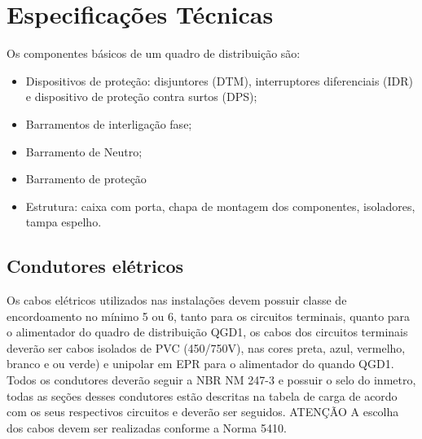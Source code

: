 \chapter{Especificações Técnicas}

Os componentes básicos de um quadro de distribuição são:
\begin{itemize}
\item Dispositivos de proteção: disjuntores (DTM), interruptores diferenciais (IDR) e dispositivo de proteção contra surtos (DPS);
\item Barramentos de interligação fase;
\item Barramento de Neutro;
\item Barramento de proteção
\item Estrutura: caixa com porta, chapa de montagem dos componentes, isoladores, tampa espelho.
\end{itemize}




\section{Condutores elétricos}
Os cabos elétricos utilizados nas instalações devem possuir classe de encordoamento no mínimo 5 ou 6, tanto para os circuitos terminais, quanto para o alimentador do quadro de distribuição QGD1, os cabos dos circuitos terminais deverão ser cabos isolados de PVC (450/750V), nas cores preta, azul, vermelho, branco e ou verde) e unipolar em EPR para o alimentador do quando QGD1.
Todos os condutores deverão seguir a NBR NM 247-3 e possuir o selo do inmetro, todas as seções desses condutores estão descritas na tabela de carga de acordo com os seus respectivos circuitos e deverão ser seguidos.
ATENÇÃO A escolha dos cabos devem ser realizadas conforme a Norma 5410.

